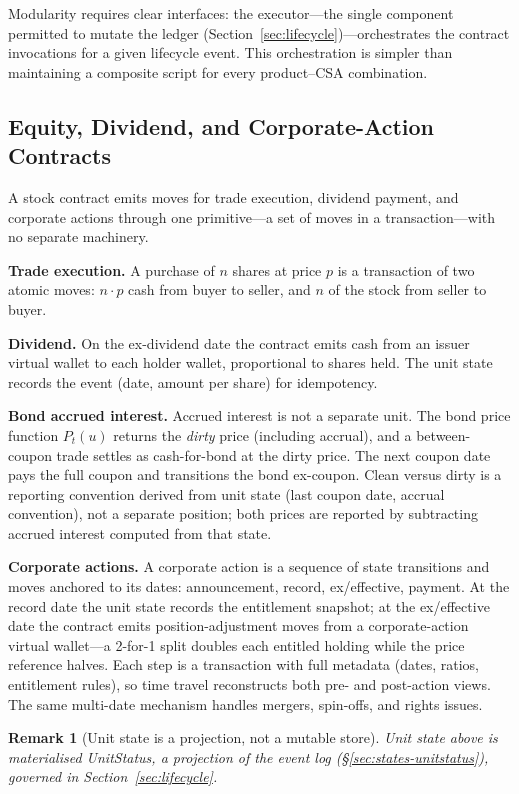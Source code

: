 \documentclass[11pt,a4paper]{article}
\newtheorem{remark}[definition]{Remark}
\begin{document}
Modularity requires clear interfaces: the executor---the single component permitted to mutate the ledger (Section~\ref{sec:lifecycle})---orchestrates the contract invocations for a given lifecycle event. This orchestration is simpler than maintaining a composite script for every product--CSA combination.

\subsection{Equity, Dividend, and Corporate-Action Contracts}

A stock contract emits moves for trade execution, dividend payment, and corporate actions through one primitive---a set of moves in a transaction---with no separate machinery.

\noindent\textbf{Trade execution.} A purchase of $n$ shares at price $p$ is a transaction of two atomic moves: $n \cdot p$ cash from buyer to seller, and $n$ of the stock from seller to buyer.

\noindent\textbf{Dividend.} On the ex-dividend date the contract emits cash from an issuer virtual wallet to each holder wallet, proportional to shares held. The unit state records the event (date, amount per share) for idempotency.

\noindent\textbf{Bond accrued interest.} Accrued interest is not a separate unit. The bond price function $P_t(u)$ returns the \emph{dirty} price (including accrual), and a between-coupon trade settles as cash-for-bond at the dirty price. The next coupon date pays the full coupon and transitions the bond ex-coupon. Clean versus dirty is a reporting convention derived from unit state (last coupon date, accrual convention), not a separate position; both prices are reported by subtracting accrued interest computed from that state.

\noindent\textbf{Corporate actions.} A corporate action is a sequence of state transitions and moves anchored to its dates: announcement, record, ex/effective, payment. At the record date the unit state records the entitlement snapshot; at the ex/effective date the contract emits position-adjustment moves from a corporate-action virtual wallet---a 2-for-1 split doubles each entitled holding while the price reference halves. Each step is a transaction with full metadata (dates, ratios, entitlement rules), so time travel reconstructs both pre- and post-action views. The same multi-date mechanism handles mergers, spin-offs, and rights issues.

\begin{remark}[Unit state is a projection, not a mutable store]
Unit state above is materialised \emph{UnitStatus}, a projection of the event log (\S\ref{sec:states-unitstatus}), governed in Section~\ref{sec:lifecycle}.
\end{remark}
\end{document}
